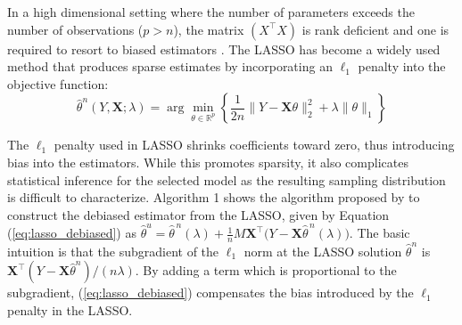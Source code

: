 \documentclass{article}
\begin{document}
In a high dimensional setting where the number of parameters exceeds the number of observations ($p > n$), the matrix $(X^\top X)$ is rank deficient and one is required to resort to biased estimators \citep{buhlmann2011statistics}. The LASSO \citep{chen_donho_1995,Tibshirani_1996} has become a widely used method that produces sparse estimates by incorporating an $\ell_1$ penalty into the objective function:
\begin{equation}
    \hat{\theta}^n(Y, \mathbf{X};\lambda) = \arg \underset{\theta \in \mathbb{R}^p}{\min} \left\{\frac{1}{2n}\|Y - \mathbf{X}\theta\|^2_2 + \lambda \|\theta\|_1\right\}
\label{eq:lasso_eq}
\end{equation}

The $\ell_1$ penalty used in LASSO shrinks coefficients toward zero, thus introducing bias into the estimators. While this promotes sparsity, it also complicates statistical inference for the selected model as the resulting sampling distribution is difficult to characterize. Algorithm 1 shows the algorithm proposed by \citet{javanmard14a} to construct the debiased estimator from the LASSO, given by Equation (\ref{eq:lasso_debiased}) as $\hat{\theta}^{u}=\hat{\theta}^{\,n}(\lambda)+\frac{1}{n}M\mathbf{X}^{\top}\bigl(Y-\mathbf{X}\hat{\theta}^{\,n}(\lambda)\bigr)$. The basic intuition is that the subgradient of the $\ell_1$ norm at the LASSO solution $\hat{\theta}^n$ is $\mathbf{X}^\top(Y - \mathbf{X}\hat{\theta}^n)/(n\lambda)$. By adding a term which is proportional to the subgradient, (\ref{eq:lasso_debiased}) compensates the bias introduced by the $\ell_1$ penalty in the LASSO.
\end{document}
